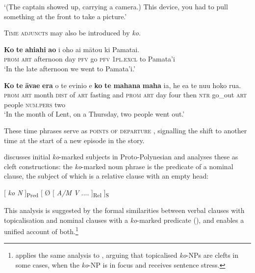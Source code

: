 \glt 
‘(The captain showed up, carrying a camera.) This device, you had to pull something at the front to take a picture.’ \textstyleExampleref{[R379.027]} 
\z

\textsc{Time adjuncts} may also be introduced by \textit{ko}. 

\ea\label{ex:8.87}
\gll \textbf{Ko} \textbf{te} \textbf{ahiahi} \textbf{{\ꞌ}ao} i oho ai mātou ki Pamata{\ꞌ}i. \\
\textsc{prom} \textsc{art} afternoon day \textsc{pfv} go \textsc{pfv} \textsc{1pl.excl} to Pamata’i \\

\glt 
‘In the late afternoon we went to Pamata’i.’ \textstyleExampleref{[Egt-02.275]}
\z

\ea\label{ex:8.88}
\gll \textbf{Ko} \textbf{te} \textbf{{\ꞌ}āva{\ꞌ}e} \textbf{era} o te evinio {\ꞌ}e \textbf{ko} \textbf{te} \textbf{mahana} \textbf{maha} ia,  he e{\ꞌ}a te nu{\ꞌ}u hoko rua.\\
\textsc{prom} \textsc{art} month \textsc{dist} of \textsc{art} fasting and \textsc{prom} \textsc{art} day four then  \textsc{ntr} go\_out \textsc{art} people \textsc{num.pers} two\\

\glt
‘In the month of Lent, on a Thursday, two people went out.’ \textstyleExampleref{[R357.001]} 
\z

These time phrases serve as \textsc{points of departure} \citep[39]{Levinsohn2007}, signalling the shift to another time at the start of a new episode in the story.

\citet[37]{Clark1976} discusses initial \textit{ko}{}-marked subjects in Proto-Polynesian and analyses these as cleft constructions: the \textit{ko}{}-marked noun phrase is the predicate of a nominal clause, the subject of which is a relative clause with an empty head: 

\ea\label{ex:8.88a}
[ \textit{ko N} ]\textsubscript{Pred}   [ Ø [ \textit{A/M V} .... ]\textsubscript{Rel} ]\textsubscript{S} 
\z

This analysis is suggested by the formal similarities between verbal clauses with topicalisation and nominal clauses with a \textit{ko}{}-marked predicate (), and enables a unified account of both.\footnote{\label{fn:425}\citet{Bauer1991} applies the same analysis to , arguing that topicalised \textit{ko}{}-NPs are clefts in some cases, when the \textit{ko}{}-NP is in focus and receives sentence stress.} 

